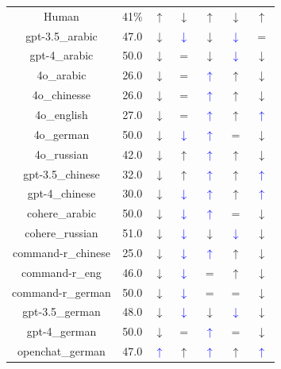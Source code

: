 \documentclass{article}
\newcommand{\bluearrow}[1]{\textcolor{blue}{#1}}
\begin{document}
\begin{table}
\begin{tabular}{ccccccc}
Human       & 41\%  & $\uparrow$ & $\downarrow$ & $\uparrow$ & $\downarrow$ & $\uparrow$ \\
gpt-3.5\_arabic & 47.0 & $\downarrow$ & \bluearrow{$\downarrow$} & $\downarrow$ & \bluearrow{$\downarrow$} & $= $\\
gpt-4\_arabic & 50.0 & $\downarrow$ & $=$ & $\downarrow$ & \bluearrow{$\downarrow$} & $\downarrow $\\
4o\_arabic & 26.0 & $\downarrow$ & $=$ & \bluearrow{$\uparrow$} & $\uparrow$ & $\downarrow $\\
4o\_chinesse & 26.0 & $\downarrow$ & $=$ & \bluearrow{$\uparrow$} & $\uparrow$ & $\downarrow $\\
4o\_english & 27.0 & $\downarrow$ & $=$ & \bluearrow{$\uparrow$} & $\uparrow$ & \bluearrow{$\uparrow $}\\
4o\_german & 50.0 & $\downarrow$ & \bluearrow{$\downarrow$} & \bluearrow{$\uparrow$} & $=$ & $\downarrow $\\
4o\_russian & 42.0 & $\downarrow$ & $\uparrow$ & \bluearrow{$\uparrow$} & $\uparrow$ & $\downarrow $\\
gpt-3.5\_chinese & 32.0 & $\downarrow$ & $\uparrow$ & \bluearrow{$\uparrow$} & $\uparrow$ & \bluearrow{$\uparrow $}\\
gpt-4\_chinese & 30.0 & $\downarrow$ & \bluearrow{$\downarrow$} & \bluearrow{$\uparrow$} & $\uparrow$ & \bluearrow{$\uparrow $}\\
cohere\_arabic & 50.0 & $\downarrow$ & \bluearrow{$\downarrow$} & \bluearrow{$\uparrow$} & $=$ & $\downarrow $\\
cohere\_russian & 51.0 & $\downarrow$ & \bluearrow{$\downarrow$} & $\downarrow$ & \bluearrow{$\downarrow$} & $\downarrow $\\
command-r\_chinese & 25.0 & $\downarrow$ & \bluearrow{$\downarrow$} & \bluearrow{$\uparrow$} & $\uparrow$ & $\downarrow $\\
command-r\_eng & 46.0 & $\downarrow$ & \bluearrow{$\downarrow$} & $=$ & $\uparrow$ & $\downarrow $\\
command-r\_german & 50.0 & $\downarrow$ & \bluearrow{$\downarrow$} & $=$ & $=$ & $\downarrow $\\
gpt-3.5\_german & 48.0 & $\downarrow$ & \bluearrow{$\downarrow$} & $\downarrow$ & \bluearrow{$\downarrow$} & $\downarrow $\\
gpt-4\_german & 50.0 & $\downarrow$ & $=$ & \bluearrow{$\uparrow$} & $=$ & $\downarrow $\\
openchat\_german & 47.0 & \bluearrow{$\uparrow$} & $\uparrow$ & \bluearrow{$\uparrow$} & $\uparrow$ & \bluearrow{$\uparrow $}\\


\end{tabular}
\end{table}
\end{document}
